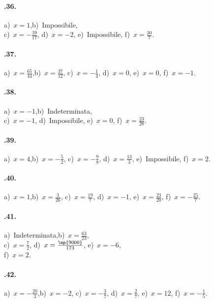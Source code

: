 \begin{multicols}{2}
\paragraph{\thechapter.36.}
a)~$x=1$,\quad b)~Impossibile,\protect\\ c)~$x=-{\frac{39}{17}}$, \quad d)~$x=-2$, \quad e)~Impossibile, \quad f)~$x=\frac{30}{7}$.

\paragraph{\thechapter.37.}
a)~$x=\frac{65}{44}$,\quad b)~$x=\frac{37}{12}$, \quad c)~$x=-{\frac{1}{4}}$, \quad d)~$x=0$, \quad e)~$x=0$, \quad f)~$x=-1$.

\paragraph{\thechapter.38.}
a)~$x=-1$,\quad b)~Indeterminata, \protect\\c)~$x=-1$, \quad d)~Impossibile, \quad e)~$x=0$, \quad f)~$x=\frac{23}{28}$.

\paragraph{\thechapter.39.}
a)~$x=4$,\quad b)~$x=-{\frac{5}{2}}$, \quad c)~$x=-{\frac{9}{8}}$, \quad d)~$x=\frac{13}{3}$, \quad e)~Impossibile, \quad f)~$x=2$.

\paragraph{\thechapter.40.}
a)~$x=1$,\quad b)~$x=\frac{3}{26}$, \quad c)~$x=\frac{19}{7}$, \quad d)~$x=-1$, \quad e)~$x=\frac{23}{20}$, \quad f)~$x=-{\frac{25}{7}}$.

\paragraph{\thechapter.41.}
a)~Indeterminata,\quad b)~$x=\frac{63}{23}$, \protect\\ c)~$x=\frac{7}{2}$, \quad d)~$x=\frac{\np{9000}}{173}$, \quad e)~$x=-6$, \protect\\ f)~$x=2$.

\paragraph{\thechapter.42.}
a)~$x=-{\frac{20}{3}}$,\quad b)~$x=-2$, \quad c)~$x=-{\frac{3}{7}}$, \quad d)~$x=\frac{2}{7}$, \quad e)~$x=12$, \quad f)~$x=-{\frac{1}{5}}$.
\end{multicols}
